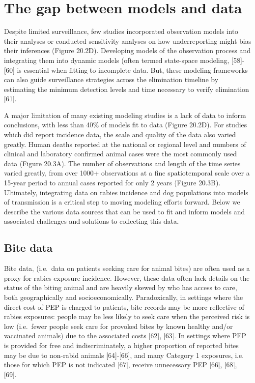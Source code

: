 \documentclass[
]{book}
\begin{document}
\hypertarget{the-gap-between-models-and-data}{%
\section{The gap between models and data}\label{the-gap-between-models-and-data}}

Despite limited surveillance, few studies incorporated observation
models into their analyses or conducted sensitivity analyses on how
underreporting might bias their inferences (Figure 20.2D). Developing
models of the observation process and integrating them into dynamic
models (often termed state-space modeling, {[}58{]}-{[}60{]} is essential
when fitting to incomplete data. But, these modeling frameworks can also
guide surveillance strategies across the elimination timeline by
estimating the minimum detection levels and time necessary to verify
elimination {[}61{]}.

A major limitation of many existing modeling studies is a lack of data
to inform conclusions, with less than 40\% of models fit to data (Figure
20.2D). For studies which did report incidence data, the scale and
quality of the data also varied greatly. Human deaths reported at the
national or regional level and numbers of clinical and laboratory
confirmed animal cases were the most commonly used data (Figure 20.3A).
The number of observations and length of the time series varied greatly,
from over 1000+ observations at a fine spatiotemporal scale over a
15-year period to annual cases reported for only 2 years (Figure 20.3B).
Ultimately, integrating data on rabies incidence and dog populations
into models of transmission is a critical step to moving modeling
efforts forward. Below we describe the various data sources that can be
used to fit and inform models and associated challenges and solutions to
collecting this data.

\hypertarget{bite-data}{%
\subsection{Bite data}\label{bite-data}}

Bite data, (i.e.~data on patients seeking care for animal bites) are
often used as a proxy for rabies exposure incidence. However, these data
often lack details on the status of the biting animal and are heavily
skewed by who has access to care, both geographically and
socioeconomically. Paradoxically, in settings where the direct cost of
PEP is charged to patients, bite records may be more reflective of
rabies exposures: people may be less likely to seek care when the
perceived risk is low (i.e.~fewer people seek care for provoked bites by
known healthy and/or vaccinated animals) due to the associated costs
{[}62{]}, {[}63{]}. In settings where PEP is provided for free and
indiscriminately, a higher proportion of reported bites may be due to
non-rabid animals {[}64{]}-{[}66{]}, and many Category 1 exposures, i.e.
those for which PEP is not indicated {[}67{]}, receive unnecessary PEP
{[}66{]}, {[}68{]}, {[}69{]}.
\end{document}
